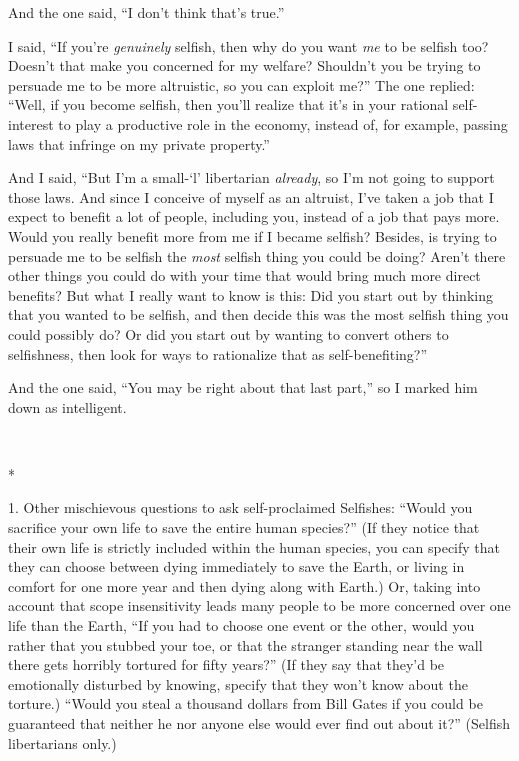 {
 And the one said, ``I don't think
that's true.''}

{
 I said, ``If you're
\textit{genuinely} selfish, then why do you want \textit{me} to be
selfish too? Doesn't that make you concerned for my
welfare? Shouldn't you be trying to persuade me to be
more altruistic, so you can exploit me?'' The one
replied: ``Well, if you become selfish, then
you'll realize that it's in your
rational self-interest to play a productive role in the economy,
instead of, for example, passing laws that infringe on my private
property.''}

{
 And I said, ``But I'm a
small-`l' libertarian \textit{already},
so I'm not going to support those laws. And since I
conceive of myself as an altruist, I've taken a job
that I expect to benefit a lot of people, including you, instead of a
job that pays more. Would you really benefit more from me if I became
selfish? Besides, is trying to persuade me to be selfish the
\textit{most} selfish thing you could be doing? Aren't
there other things you could do with your time that would bring much
more direct benefits? But what I really want to know is this: Did you
start out by thinking that you wanted to be selfish, and then decide
this was the most selfish thing you could possibly do? Or did you start
out by wanting to convert others to selfishness, then look for ways to
rationalize that as self-benefiting?''}

{
 And the one said, ``You may be right about that
last part,'' so I marked him down as intelligent.}

{\centering
 \ ~
\par}

{\centering
 *
\par}


\bigskip

{
 1. Other mischievous questions to ask self-proclaimed Selfishes:
``Would you sacrifice your own life to save the entire
human species?'' (If they notice that their own life
is strictly included within the human species, you can specify that
they can choose between dying immediately to save the Earth, or living
in comfort for one more year and then dying along with Earth.) Or,
taking into account that scope insensitivity leads many people to be
more concerned over one life than the Earth, ``If you
had to choose one event or the other, would you rather that you stubbed
your toe, or that the stranger standing near the wall there gets
horribly tortured for fifty years?'' (If they say
that they'd be emotionally disturbed by knowing,
specify that they won't know about the torture.)
``Would you steal a thousand dollars from Bill Gates
if you could be guaranteed that neither he nor anyone else would ever
find out about it?'' (Selfish libertarians only.)}

